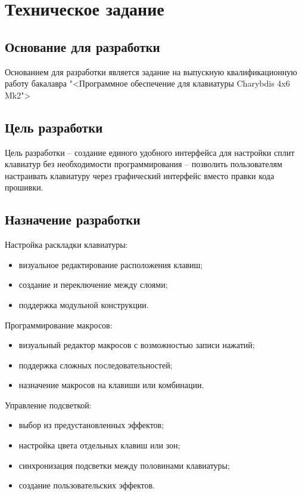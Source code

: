 \section{Техническое задание}
\subsection{Основание для разработки}

Основанием для разработки является задание на выпускную квалификационную работу бакалавра "<Программное обеспечение для клавиатуры Charybdis 4x6 Mk2">

\subsection{Цель разработки}

Цель разработки -- создание единого удобного интерфейса для настройки сплит клавиатур без необходимости программирования -- позволить пользователям настраивать клавиатуру через графический интерфейс вместо правки кода прошивки.

\subsection{Назначение разработки}

Настройка раскладки клавиатуры:

\begin{itemize}
\item визуальное редактирование расположения клавиш;
\item создание и переключение между слоями;
\item поддержка модульной конструкции.
\end{itemize}

Программирование макросов:

\begin{itemize}
\item визуальный редактор макросов с возможностью записи нажатий;
\item поддержка сложных последовательностей;
\item назначение макросов на клавиши или комбинации.
\end{itemize}

Управление подсветкой:

\begin{itemize}
\item выбор из предустановленных эффектов;
\item настройка цвета отдельных клавиш или зон;
\item синхронизация подсветки между половинами клавиатуры;
\item создание пользовательских эффектов.
\end{itemize}

